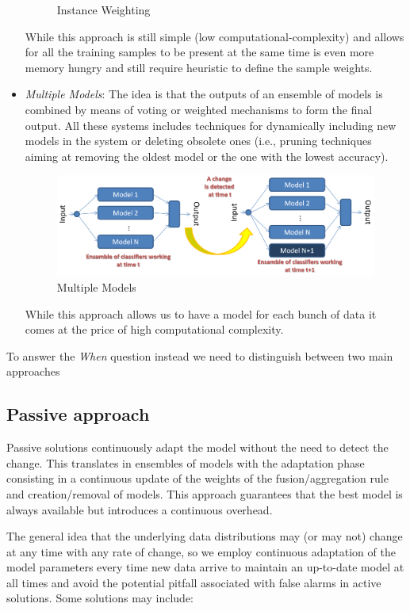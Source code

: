 \documentclass{article}
\begin{document}
\begin{itemize}
\begin{figure}[H]
        \centering
        \caption{Instance Weighting}
      \end{figure}
      While this approach is still simple (low computational-complexity) and allows for all the training samples to be present at the same time is even more memory hungry and still require heuristic to define the sample weights. 
      \item \emph{Multiple Models}: The idea is that the outputs of an ensemble of models is combined by means of voting or weighted mechanisms to form the final output. All these systems includes techniques for dynamically including new models in the system or deleting
      obsolete ones (i.e., pruning techniques aiming at removing the oldest model or the one with the lowest accuracy).
      \begin{figure}[H]
        \includegraphics[scale=0.35]{../Images/MultipleModels.png}
        \centering
        \caption{Multiple Models}
      \end{figure}
      While this approach allows us to have a model for each bunch of data it comes at the price of high computational complexity.
    \end{itemize}

    To answer the \emph{When} question instead we need to distinguish between two main approaches
    \subsection{Passive approach}
      Passive solutions continuously adapt the model without the need to detect the change. This translates in ensembles of models with the adaptation phase consisting in a continuous update of the weights
      of the fusion/aggregation rule and creation/removal of models. This approach guarantees that the best model is always available but introduces a continuous overhead.

      The general idea that the underlying data distributions may (or may not) change at any time with any rate of change, so we employ continuous adaptation of the model parameters every time new data arrive to maintain an up-to-date model at all times and
      avoid the potential pitfall associated with false alarms in active solutions. Some solutions may include:
      
\end{document}
